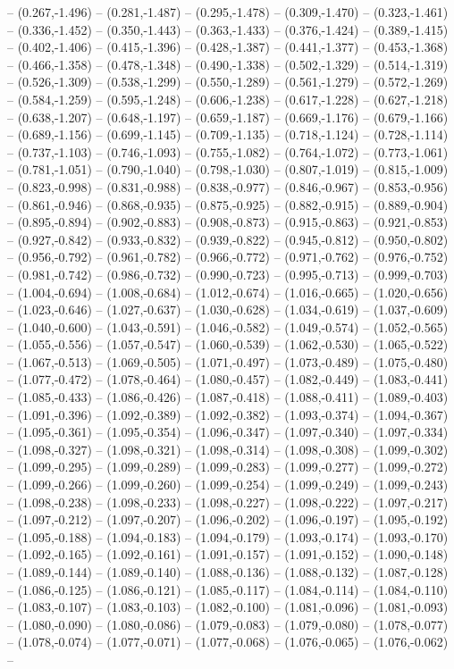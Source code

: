 -- (0.267,-1.496) -- (0.281,-1.487) -- (0.295,-1.478) -- (0.309,-1.470) -- (0.323,-1.461) -- (0.336,-1.452) -- (0.350,-1.443) -- (0.363,-1.433) -- (0.376,-1.424) -- (0.389,-1.415) -- (0.402,-1.406) -- (0.415,-1.396) -- (0.428,-1.387) -- (0.441,-1.377) -- (0.453,-1.368) -- (0.466,-1.358) -- (0.478,-1.348) -- (0.490,-1.338) -- (0.502,-1.329) -- (0.514,-1.319) -- (0.526,-1.309) -- (0.538,-1.299) -- (0.550,-1.289) -- (0.561,-1.279) -- (0.572,-1.269) -- (0.584,-1.259) -- (0.595,-1.248) -- (0.606,-1.238) -- (0.617,-1.228) -- (0.627,-1.218) -- (0.638,-1.207) -- (0.648,-1.197) -- (0.659,-1.187) -- (0.669,-1.176) -- (0.679,-1.166) -- (0.689,-1.156) -- (0.699,-1.145) -- (0.709,-1.135) -- (0.718,-1.124) -- (0.728,-1.114) -- (0.737,-1.103) -- (0.746,-1.093) -- (0.755,-1.082) -- (0.764,-1.072) -- (0.773,-1.061) -- (0.781,-1.051) -- (0.790,-1.040) -- (0.798,-1.030) -- (0.807,-1.019) -- (0.815,-1.009) -- (0.823,-0.998) -- (0.831,-0.988) -- (0.838,-0.977) -- (0.846,-0.967) -- (0.853,-0.956) -- (0.861,-0.946) -- (0.868,-0.935) -- (0.875,-0.925) -- (0.882,-0.915) -- (0.889,-0.904) -- (0.895,-0.894) -- (0.902,-0.883) -- (0.908,-0.873) -- (0.915,-0.863) -- (0.921,-0.853) -- (0.927,-0.842) -- (0.933,-0.832) -- (0.939,-0.822) -- (0.945,-0.812) -- (0.950,-0.802) -- (0.956,-0.792) -- (0.961,-0.782) -- (0.966,-0.772) -- (0.971,-0.762) -- (0.976,-0.752) -- (0.981,-0.742) -- (0.986,-0.732) -- (0.990,-0.723) -- (0.995,-0.713) -- (0.999,-0.703) -- (1.004,-0.694) -- (1.008,-0.684) -- (1.012,-0.674) -- (1.016,-0.665) -- (1.020,-0.656) -- (1.023,-0.646) -- (1.027,-0.637) -- (1.030,-0.628) -- (1.034,-0.619) -- (1.037,-0.609) -- (1.040,-0.600) -- (1.043,-0.591) -- (1.046,-0.582) -- (1.049,-0.574) -- (1.052,-0.565) -- (1.055,-0.556) -- (1.057,-0.547) -- (1.060,-0.539) -- (1.062,-0.530) -- (1.065,-0.522) -- (1.067,-0.513) -- (1.069,-0.505) -- (1.071,-0.497) -- (1.073,-0.489) -- (1.075,-0.480) -- (1.077,-0.472) -- (1.078,-0.464) -- (1.080,-0.457) -- (1.082,-0.449) -- (1.083,-0.441) -- (1.085,-0.433) -- (1.086,-0.426) -- (1.087,-0.418) -- (1.088,-0.411) -- (1.089,-0.403) -- (1.091,-0.396) -- (1.092,-0.389) -- (1.092,-0.382) -- (1.093,-0.374) -- (1.094,-0.367) -- (1.095,-0.361) -- (1.095,-0.354) -- (1.096,-0.347) -- (1.097,-0.340) -- (1.097,-0.334) -- (1.098,-0.327) -- (1.098,-0.321) -- (1.098,-0.314) -- (1.098,-0.308) -- (1.099,-0.302) -- (1.099,-0.295) -- (1.099,-0.289) -- (1.099,-0.283) -- (1.099,-0.277) -- (1.099,-0.272) -- (1.099,-0.266) -- (1.099,-0.260) -- (1.099,-0.254) -- (1.099,-0.249) -- (1.099,-0.243) -- (1.098,-0.238) -- (1.098,-0.233) -- (1.098,-0.227) -- (1.098,-0.222) -- (1.097,-0.217) -- (1.097,-0.212) -- (1.097,-0.207) -- (1.096,-0.202) -- (1.096,-0.197) -- (1.095,-0.192) -- (1.095,-0.188) -- (1.094,-0.183) -- (1.094,-0.179) -- (1.093,-0.174) -- (1.093,-0.170) -- (1.092,-0.165) -- (1.092,-0.161) -- (1.091,-0.157) -- (1.091,-0.152) -- (1.090,-0.148) -- (1.089,-0.144) -- (1.089,-0.140) -- (1.088,-0.136) -- (1.088,-0.132) -- (1.087,-0.128) -- (1.086,-0.125) -- (1.086,-0.121) -- (1.085,-0.117) -- (1.084,-0.114) -- (1.084,-0.110) -- (1.083,-0.107) -- (1.083,-0.103) -- (1.082,-0.100) -- (1.081,-0.096) -- (1.081,-0.093) -- (1.080,-0.090) -- (1.080,-0.086) -- (1.079,-0.083) -- (1.079,-0.080) -- (1.078,-0.077) -- (1.078,-0.074) -- (1.077,-0.071) -- (1.077,-0.068) -- (1.076,-0.065) -- (1.076,-0.062) -- 